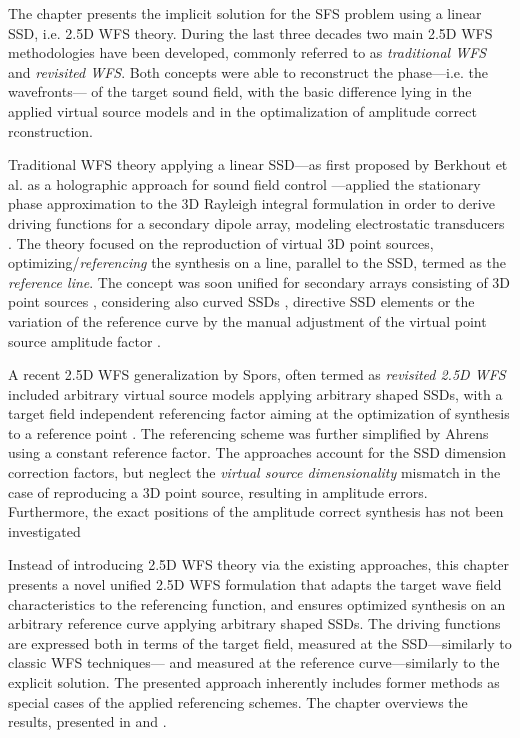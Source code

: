 The chapter presents the implicit solution for the SFS problem using a linear SSD, i.e. 2.5D WFS theory.
During the last three decades two main 2.5D WFS methodologies have been developed, commonly referred to as \emph{traditional WFS} and \emph{revisited WFS}.
Both concepts were able to reconstruct the phase---i.e. the wavefronts--- of the target sound field, with the basic difference lying in the applied virtual source models and in the optimalization of amplitude correct rconstruction.

Traditional WFS theory applying a linear SSD---as first proposed by Berkhout et al. as a holographic approach for sound field control \cite{Berkhout1988}---applied the stationary phase approximation to the 3D Rayleigh integral formulation in order to derive driving functions for a secondary dipole array, modeling electrostatic transducers \cite{Berkhout93}.
The theory focused on the reproduction of virtual 3D point sources, optimizing/\emph{referencing} the synthesis on a line, parallel to the SSD, termed as the \emph{reference line}.
The concept was soon unified for secondary arrays consisting of 3D point sources \cite{Start1997:phd,Vogel1993:phd, Verheijen1997:phd, Bruijn2004, Hulsebos2004}, considering also curved SSDs \cite{start1996application}, directive SSD elements \cite{devries1996sound} or the variation of the reference curve by the manual adjustment of the virtual point source amplitude factor \cite{Sonke1998, Sonke2000:Phd}.

A recent 2.5D WFS generalization by Spors, often termed as \emph{revisited 2.5D WFS} included arbitrary virtual source models applying arbitrary shaped SSDs, with a target field independent referencing factor aiming at the optimization of synthesis to a reference point \cite{Spors2008:WFSrevisited}.
The referencing scheme was further simplified by Ahrens \cite{Ahrens2012} using a constant reference factor.
The approaches account for the SSD dimension correction factors, but neglect the \emph{virtual source dimensionality} mismatch \cite{Voelk2012} in the case of reproducing a 3D point source, resulting in amplitude errors.
Furthermore, the exact positions of the amplitude correct synthesis has not been investigated 

Instead of introducing 2.5D WFS theory via the existing approaches, this chapter presents a novel unified 2.5D WFS formulation that adapts the target wave field characteristics to the referencing function, and ensures optimized synthesis on an arbitrary reference curve applying arbitrary shaped SSDs.
The driving functions are expressed both in terms of the target field, measured at the SSD---similarly to classic WFS techniques--- and measured at the reference curve---similarly to the explicit solution.
The presented approach inherently includes former methods as special cases of the applied referencing schemes.
The chapter overviews the results, presented in \cite{Firtha2016:UnifiedWFS} and \cite{Firtha2016:WFS_vs_SDM}.

